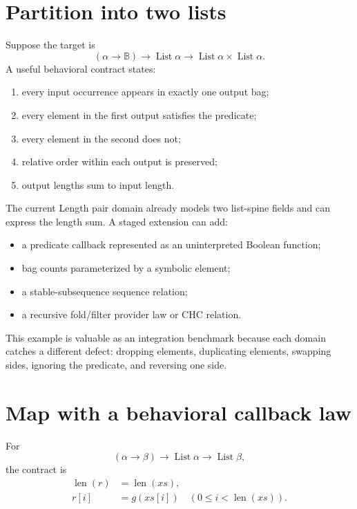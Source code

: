 \documentclass[11pt,oneside]{report}
\newcommand{\Bool}{\mathbb{B}}
\begin{document}
\section{Partition into two lists}
\label{sec:example-partition}

Suppose the target is
\[
(\alpha\to\Bool)\to\operatorname{List}\alpha\to
\operatorname{List}\alpha\times\operatorname{List}\alpha.
\]
A useful behavioral contract states:

\begin{enumerate}[leftmargin=2em]
\item every input occurrence appears in exactly one output bag;
\item every element in the first output satisfies the predicate;
\item every element in the second does not;
\item relative order within each output is preserved;
\item output lengths sum to input length.
\end{enumerate}

The current Length pair domain already models two list-spine fields and can express the length sum. A staged extension can add:

\begin{itemize}[leftmargin=2em]
\item a predicate callback represented as an uninterpreted Boolean function;
\item bag counts parameterized by a symbolic element;
\item a stable-subsequence sequence relation;
\item a recursive fold/filter provider law or CHC relation.
\end{itemize}

This example is valuable as an integration benchmark because each domain catches a different defect: dropping elements, duplicating elements, swapping sides, ignoring the predicate, and reversing one side.

\section{Map with a behavioral callback law}
\label{sec:example-map}

For
\[
(\alpha\to\beta)\to\operatorname{List}\alpha\to\operatorname{List}\beta,
\]
the contract is
\begin{align*}
\operatorname{len}(r)&=\operatorname{len}(xs),\\
r[i]&=g(xs[i])\quad(0\le i<\operatorname{len}(xs)).
\end{align*}
\end{document}

